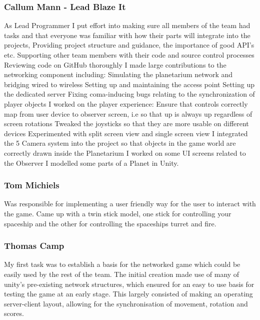 \documentclass[11pt,a4paper]{article}
\begin{document}
        \subsubsection{Callum Mann - Lead Blaze It}
        As Lead Programmer I put effort into making sure all members of the team had tasks and that everyone was familiar with how their parts will integrate into the projects,
        Providing project structure and guidance, the importance of good API’s etc.
        Supporting other team members with their code and source control processes
        Reviewing code on GitHub thoroughly
        I made large contributions to the networking component including:
        Simulating the planetarium network and bridging wired to wireless
        Setting up and maintaining the access point
        Setting up the dedicated server 
        Fixing coma-inducing bugs relating to the synchronization of player objects
        I worked on the player experience:
        Ensure that controls correctly map from user device to observer screen, i.e so that up is always up regardless of screen rotations
        Tweaked the joysticks so that they are more usable on different devices
        Experimented with split screen view and single screen view
        I integrated the 5 Camera system into the project so that objects in the game world are correctly drawn inside the Planetarium
        I worked on some UI screens related to the Observer
        I modelled some parts of a Planet in Unity.







        \subsubsection{Tom Michiels}

        Was responsible for implementing a user friendly way for the user to interact with the game. Came up with a twin stick model, one stick for controlling your spaceship and the other for controlling the spaceships turret and fire.

        \subsubsection{Thomas Camp}

        My first task was to establish a basis for the networked game which could be easily used by the rest of the team. The initial creation made use of many of unity’s pre-existing network structures, which ensured for an easy to use basis for testing the game at an early stage. This largely consisted of making an operating server-client layout, allowing for the synchronisation of movement, rotation and scores.
\end{document}
